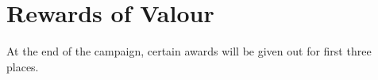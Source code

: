 \section{Rewards of Valour}

At the end of the campaign, certain awards will be given out for first three places.
